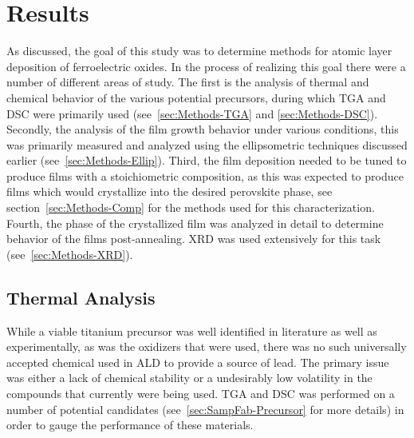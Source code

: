 \chapter{Results}
\label{ch:Results}
\thispagestyle{empty}


As discussed, the goal of this study was to determine methods for atomic layer deposition of ferroelectric oxides. In the process of realizing this goal there were a number of different areas of study. The first is the analysis of thermal and chemical behavior of the various potential precursors, during which TGA and DSC were primarily used (see~\vref{sec:Methods-TGA} and \vref{sec:Methods-DSC}). Secondly,  the analysis of the film growth behavior under various conditions, this was primarily measured and analyzed using the ellipsometric techniques discussed earlier (see~\vref{sec:Methods-Ellip}). Third, the film deposition needed to be tuned to produce films with a stoichiometric composition, as this was expected to produce films which would crystallize into the desired perovskite phase, see section~\vref{sec:Methods-Comp} for the methods used for this characterization. Fourth, the phase of the crystallized film was analyzed in detail to determine behavior of the films post-annealing. XRD was used extensively for this task (see~\vref{sec:Methods-XRD}).



\section{Thermal Analysis}
\label{chap:Results-Thermal}

While a viable titanium precursor was well identified in literature as well as experimentally, as was the oxidizers that were used, there was no such universally accepted chemical used in ALD to provide a source of lead. The primary issue was either a lack of chemical stability or a undesirably low volatility in the compounds that currently were being used. TGA and DSC was performed on a number of potential candidates (see~\vref{sec:SampFab-Precursor} for more details) in order to gauge the performance of these materials. 

